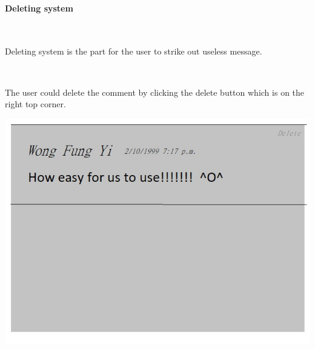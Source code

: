 \paragraph{Deleting system}~

Deleting system is the part for the user to strike out useless message.\par~

The user could delete the comment by clicking the delete button which is on the right top corner.

\includegraphics[scale=0.5]{Doc/Graphics/asdf}
